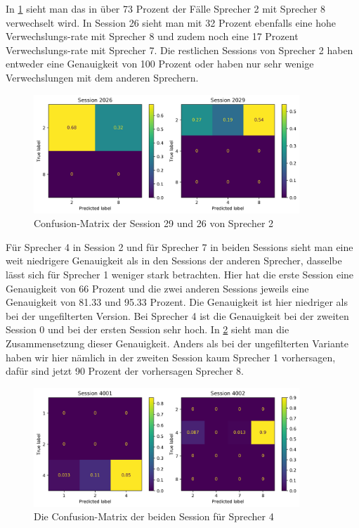 In \ref{fig:cnf5} sieht man das in über 73 Prozent der Fälle Sprecher 2 mit Sprecher 8 verwechselt wird. In Session 26 sieht man mit 32 Prozent ebenfalls eine hohe Verwechslungs-rate mit Sprecher 8 und zudem noch eine 17 Prozent Verwechslungs-rate mit Sprecher 7. Die restlichen Sessions von Sprecher 2 haben entweder eine Genauigkeit von 100 Prozent oder haben nur sehr wenige Verwechslungen mit dem anderen Sprechern.

\begin{figure}[H]
  \centering
  \includegraphics[width=100mm ,scale=0.6]{UserConfMatUser2.png}
  \caption{Confusion-Matrix der Session 29 und 26 von Sprecher 2}
  \label{fig:cnf5}
\end{figure}

Für Sprecher 4 in Session 2 und für Sprecher 7 in beiden Sessions sieht man eine weit niedrigere Genauigkeit als in den Sessions der anderen Sprecher, dasselbe lässt sich für Sprecher 1 weniger stark betrachten. Hier hat die erste Session eine Genauigkeit von 66 Prozent und die zwei anderen Sessions jeweils eine Genauigkeit von 81.33 und 95.33 Prozent. Die Genauigkeit ist hier niedriger als bei der ungefilterten Version. Bei Sprecher 4 ist die Genauigkeit bei der zweiten Session 0 und bei der ersten Session sehr hoch. In \ref{fig:cnf6} sieht man die Zusammensetzung dieser Genauigkeit. Anders als bei der ungefilterten Variante haben wir hier nämlich in der zweiten Session kaum Sprecher 1 vorhersagen, dafür sind jetzt 90 Prozent der vorhersagen Sprecher 8.

\begin{figure}[H]
  \centering
  \includegraphics[width=100mm ,scale=0.4]{UserConfMatUser4.png}
  \caption{Die Confusion-Matrix der beiden Session für Sprecher 4}
  \label{fig:cnf6}
\end{figure}

